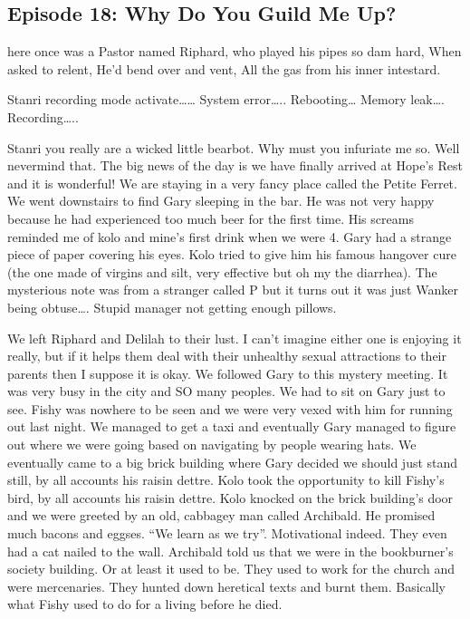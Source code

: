 \subsection{Episode 18: Why Do You Guild Me Up?}
here once was a Pastor named Riphard, who played his pipes so dam hard, When asked to relent, He’d bend over and vent, All the gas from his inner intestard.\medskip

Stanri recording mode activate…… System error….. Rebooting… Memory leak…. Recording…..\medskip

Stanri you really are a wicked little bearbot. Why must you infuriate me so. Well nevermind that. The big news of the day is we have finally arrived at Hope’s Rest and it is wonderful! We are staying in a very fancy place called the Petite Ferret. We went downstairs to find Gary sleeping in the bar. He was not very happy because he had experienced too much beer for the first time. His screams reminded me of kolo and mine’s first drink when we were 4. Gary had a strange piece of paper covering his eyes. Kolo tried to give him his famous hangover cure (the one made of virgins and silt, very effective but oh my the diarrhea). The mysterious note was from a stranger called P but it turns out it was just Wanker being obtuse…. Stupid manager not getting enough pillows.\medskip

We left Riphard and Delilah to their lust. I can’t imagine either one is enjoying it really, but if it helps them deal with their unhealthy sexual attractions to their parents then I suppose it is okay. We followed Gary to this mystery meeting. It was very busy in the city and SO many peoples. We had to sit on Gary just to see. Fishy was nowhere to be seen and we were very vexed with him for running out last night. We managed to get a taxi and eventually Gary managed to figure out where we were going based on navigating by people wearing hats. We eventually came to a big brick building where Gary decided we should just stand still, by all accounts his raisin dettre. Kolo took the opportunity to kill Fishy’s bird, by all accounts his raisin dettre. Kolo knocked on the brick building’s door and we were greeted by an old, cabbagey man called Archibald. He promised much bacons and eggses. “We learn as we try”. Motivational indeed. They even had a cat nailed to the wall. Archibald told us that we were in the bookburner’s society building. Or at least it used to be. They used to work for the church and were mercenaries. They hunted down heretical texts and burnt them. Basically what Fishy used to do for a living before he died.\medskip

